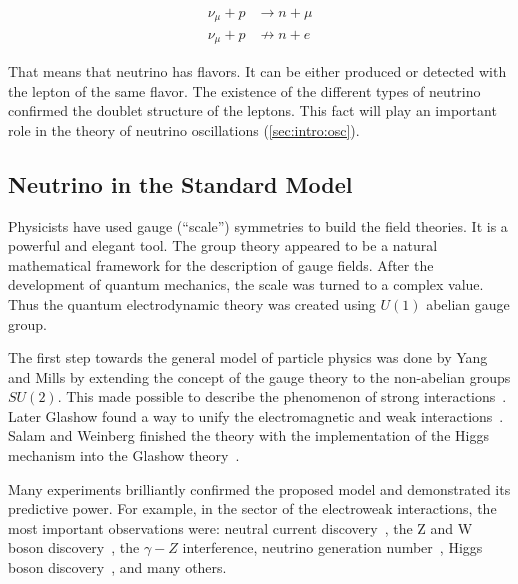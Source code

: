 \documentclass[../main.tex]{subfiles}
\begin{document}
\begin{align}
\label{eq:allowed}
\nu_\mu+p&\rightarrow n+\mu \\
\nu_\mu+p&\nrightarrow n+e
\label{eq:notallowed}
\end{align}

That means that neutrino has flavors. It can be either produced or detected with the lepton of the same flavor. The existence of the different types of neutrino confirmed the doublet structure of the leptons. This fact will play an important role in the theory of neutrino oscillations (\autoref{sec:intro:osc}).

\subsection{Neutrino in the Standard Model}
\label{sec:sm}

Physicists have used gauge (``scale'') symmetries to build the field theories. It is a powerful and elegant tool. The group theory appeared to be a natural mathematical framework for the description of gauge fields. After the development of quantum mechanics, the scale was turned to a complex value. Thus the quantum electrodynamic theory was created using $U(1)$ abelian gauge group.

The first step towards the general model of particle physics was done by Yang and Mills by extending the concept of the gauge theory to the non-abelian groups $SU(2)$. This made possible to describe the phenomenon of strong interactions~\cite{Yang1954}. Later Glashow found a way to unify the electromagnetic and weak interactions~\cite{Glashow1961}. Salam and Weinberg finished the theory with the implementation of the Higgs mechanism into the Glashow theory~\cite{Weinberg1967}.

Many experiments brilliantly confirmed the proposed model and demonstrated its predictive power. For example, in the sector of the electroweak interactions, the most important observations were: neutral current discovery~\cite{Cundy1974}, the Z and W boson discovery~\cite{Arnison1983}, the $\gamma-Z$ interference, neutrino generation number~\cite{Arnison1983}, Higgs boson discovery~\cite{Aad2012}, and many others.


\end{document}
